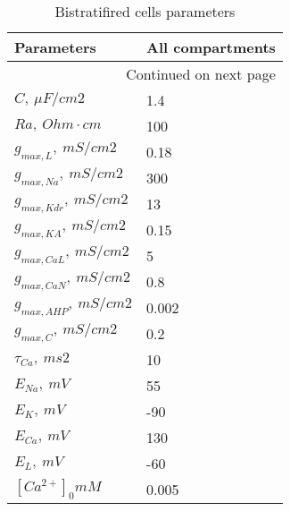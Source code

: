 \begin{longtable}{ll}
\caption{Bistratifired cells parameters}\label{ca1_bis_cell_parameters}\\
\toprule
                                        Parameters & All compartments \\
\midrule
\endhead
\midrule
\multicolumn{2}{r}{{Continued on next page}} \\
\midrule
\endfoot

\bottomrule
\endlastfoot
$C,\ \mu F/cm2$ &    1.4 \\
$Ra,\ Ohm \cdot cm$ & 100 \\
$g_{max, L},\ mS/cm2 $ & 0.18 \\
$g_{max, Na}, \ mS/cm2$ &              300 \\
$g_{max, Kdr},\ mS/cm2$ &               13 \\
$g_{max, KA},\ mS/cm2$ &             0.15 \\
$g_{max, CaL},\ mS/cm2$   &                5 \\
$g_{max, CaN},\ mS/cm2$   &              0.8 \\
$g_{max, AHP},\ mS/cm2$   &            0.002 \\
$g_{max, C},\ mS/cm2$  &              0.2 \\
$\tau_{Ca},\ ms2$  &               10 \\
$E_{Na}, \ mV $&               55 \\
$E_K, \ mV$ &              -90 \\
$E_{Ca}, \ mV$ &              130 \\
$E_L, \ mV$ &              -60 \\
$[Ca^{2+}]_0 mM$ &                0.005 \\
\end{longtable}
